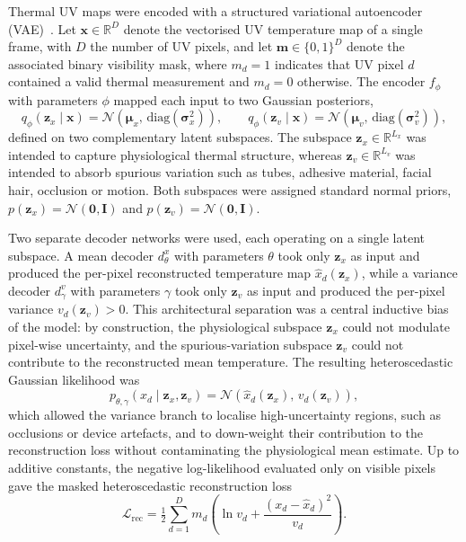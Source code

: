 \documentclass[pdflatex,sn-basic,Numbered]{sn-jnl}
\theoremstyle{thmstyleone}%
\theoremstyle{thmstyletwo}%
\theoremstyle{thmstylethree}%
\begin{document}
Thermal UV maps were encoded with a structured variational autoencoder (VAE)~\citep{kingma2013auto}. Let $\mathbf{x}\in\mathbb{R}^{D}$ denote the vectorised UV temperature map of a single frame, with $D$ the number of UV pixels, and let $\mathbf{m}\in\{0,1\}^{D}$ denote the associated binary visibility mask, where $m_d=1$ indicates that UV pixel $d$ contained a valid thermal measurement and $m_d=0$ otherwise. The encoder $f_{\phi}$ with parameters $\phi$ mapped each input to two Gaussian posteriors,
\[
  q_{\phi}(\mathbf{z}_{x}\mid\mathbf{x}) = \mathcal{N}\!\left(\bm{\mu}_{x},\,\mathrm{diag}(\bm{\sigma}_{x}^{2})\right), \qquad
  q_{\phi}(\mathbf{z}_{v}\mid\mathbf{x}) = \mathcal{N}\!\left(\bm{\mu}_{v},\,\mathrm{diag}(\bm{\sigma}_{v}^{2})\right),
\]
defined on two complementary latent subspaces. The subspace $\mathbf{z}_{x}\in\mathbb{R}^{L_{x}}$ was intended to capture physiological thermal structure, whereas $\mathbf{z}_{v}\in\mathbb{R}^{L_{v}}$ was intended to absorb spurious variation such as tubes, adhesive material, facial hair, occlusion or motion. Both subspaces were assigned standard normal priors, $p(\mathbf{z}_{x})=\mathcal{N}(\mathbf{0},\mathbf{I})$ and $p(\mathbf{z}_{v})=\mathcal{N}(\mathbf{0},\mathbf{I})$.

Two separate decoder networks were used, each operating on a single latent subspace. A mean decoder $d_{\theta}^{x}$ with parameters $\theta$ took only $\mathbf{z}_{x}$ as input and produced the per-pixel reconstructed temperature map $\hat{x}_{d}(\mathbf{z}_{x})$, while a variance decoder $d_{\gamma}^{v}$ with parameters $\gamma$ took only $\mathbf{z}_{v}$ as input and produced the per-pixel variance $v_{d}(\mathbf{z}_{v})>0$. This architectural separation was a central inductive bias of the model: by construction, the physiological subspace $\mathbf{z}_{x}$ could not modulate pixel-wise uncertainty, and the spurious-variation subspace $\mathbf{z}_{v}$ could not contribute to the reconstructed mean temperature. The resulting heteroscedastic Gaussian likelihood was
\[
  p_{\theta,\gamma}(x_{d}\mid\mathbf{z}_{x},\mathbf{z}_{v}) = \mathcal{N}\!\left(\hat{x}_{d}(\mathbf{z}_{x}),\,v_{d}(\mathbf{z}_{v})\right),
\]
which allowed the variance branch to localise high-uncertainty regions, such as occlusions or device artefacts, and to down-weight their contribution to the reconstruction loss without contaminating the physiological mean estimate. Up to additive constants, the negative log-likelihood evaluated only on visible pixels gave the masked heteroscedastic reconstruction loss
\[
  \mathcal{L}_{\mathrm{rec}} = \tfrac{1}{2}\sum_{d=1}^{D} m_{d}\left(\ln v_{d} + \frac{(x_{d}-\hat{x}_{d})^{2}}{v_{d}}\right).
\]
\end{document}
